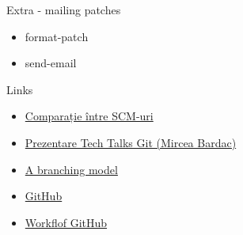 \documentclass{beamer}
\begin{document}
\begin{frame}{Extra - mailing patches}
  \begin{itemize}
    \item format-patch
    \item send-email
  \end{itemize}
\end{frame}

\begin{frame}[label=l]{Links}
  \begin{itemize}
    \item \href{http://en.wikipedia.org/wiki/Comparison_of_revision_control_software}{Comparație între SCM-uri}
    \item \href{http://talks.rosedu.org/prezentari/prezentarea03}{Prezentare
    Tech Talks Git (Mircea Bardac)}
    \item \href{http://nvie.com/posts/a-successful-git-branching-model/}{A
    branching model}
    \item \href{http://github.com}{GitHub}
    \item
    \href{http://www.eqqon.com/index.php/Collaborative_Github_Workflow}{Workflof
    GitHub}
  \end{itemize}
\end{frame}
\end{document}
